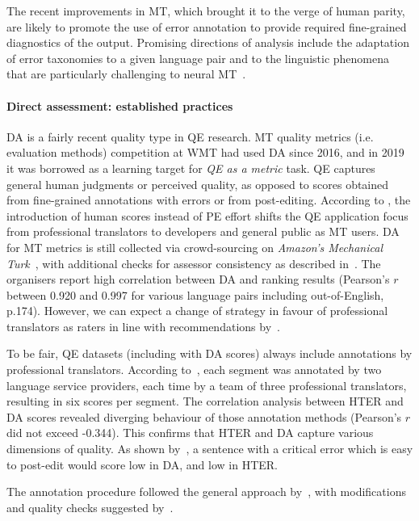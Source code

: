The recent improvements in MT, which brought it to the verge of human parity, are likely to promote the use of error annotation to provide required fine-grained diagnostics of the output. Promising directions of analysis include the adaptation of error taxonomies to a given language pair and to the linguistic phenomena that are particularly challenging to neural MT~\cite{Klubivcka2018}. 

\paragraph{Direct assessment: established practices}
\gls{DA} is a fairly recent quality type in QE research. MT quality metrics (i.e. evaluation methods) competition at WMT had used DA since 2016, and in 2019 it was borrowed as a learning target for \textit{QE as a metric} task. 
QE captures general human judgments or perceived quality, as opposed to scores obtained from fine-grained annotations with errors or from post-editing. 
According to \citet{Fonseca2019}, the introduction of human scores instead of PE effort shifts the QE application focus from professional translators to developers and general public as MT users. 
DA for MT metrics is still collected via crowd-sourcing on \textit{Amazon's Mechanical Turk}~\cite[p.9]{Akhbardeh2021}, with additional checks for assessor consistency as described in~\citet{Graham2015}. The organisers report high correlation between DA and ranking results (Pearson's $r$ between 0.920 and 0.997 for various language pairs including out-of-English, p.174).
However, we can expect a change of strategy in favour of professional translators as raters in line with recommendations by~\citet{Laubli2020}.

To be fair, QE datasets (including with DA scores) always include annotations by professional translators. According to~\citet{Fomicheva2020a}, each segment was annotated by two language service providers, each time by a team of three professional translators, resulting in six scores per segment. The correlation analysis between HTER and DA scores revealed diverging behaviour of those annotation methods (Pearson's $r$ did not exceed -0.344).
This confirms that HTER and DA capture various dimensions of quality. As shown by~\citet{Fomicheva2020a}, a sentence with a critical error which is easy to post-edit would score low in DA, and low in HTER. 

The annotation procedure followed the general approach by~\citet{Graham2013}, with modifications and quality checks suggested by~\citet{Guzman2019}. 

